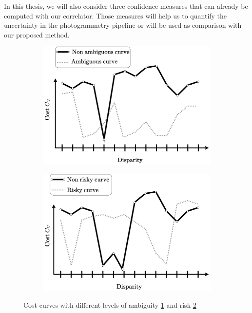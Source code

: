 In this thesis, we will also consider three confidence measures that can already be computed with our correlator. Those measures will help us to quantify the uncertainty in the photogrammetry pipeline or will be used as comparison with our proposed method.

\begin{figure}
    \centering
    \begin{subfigure}[t]{0.5\linewidth}
        \centering
        \includegraphics[width=\linewidth]{Images/Chap_1/Ambiguity.png}
        \caption{}
        \label{fig:ambgiuity}
    \end{subfigure}\hfill
    \begin{subfigure}[t]{0.5\linewidth}
        \centering
        \includegraphics[width=\linewidth]{Images/Chap_1/Risk.png}
        \caption{}
        \label{fig:risk}
    \end{subfigure}\hfill
    \caption{Cost curves with different levels of ambiguity \ref{fig:ambgiuity} and risk \ref{fig:risk}}
    \label{fig:ambiguity_risk}
\end{figure}

